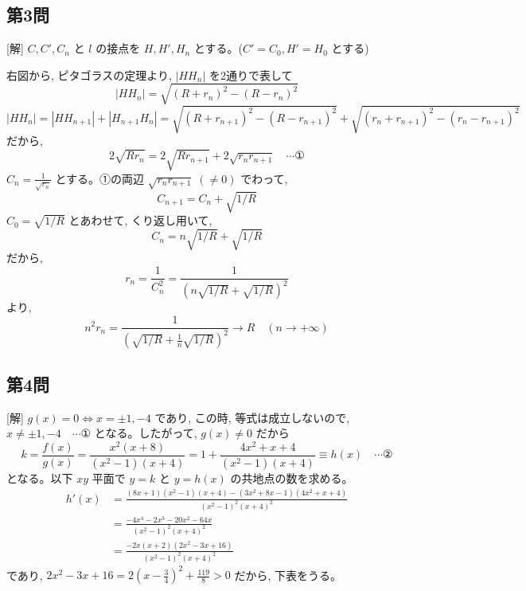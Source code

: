 \documentclass[../main.tex]{subfiles}
\begin{document}
\subsection*{第3問}

[解] $C, C', C_n$ と $l$ の接点を $H, H', H_n$ とする。($C' = C_0, H' = H_0$ とする)

右図から, ピタゴラスの定理より, $|HH_n|$ を2通りで表して
\[
  |HH_n| = \sqrt{(R+r_n)^2 - (R-r_n)^2}
\]
\[
  |HH_n| = |HH_{n+1}| + |H_{n+1}H_n| = \sqrt{(R+r_{n+1})^2 - (R-r_{n+1})^2} + \sqrt{(r_n+r_{n+1})^2 - (r_n-r_{n+1})^2}
\]
だから,
\[
  2\sqrt{Rr_n} = 2\sqrt{Rr_{n+1}} + 2\sqrt{r_n r_{n+1}} \quad \cdots \text{①}
\]
$C_n = \frac{1}{\sqrt{r_n}}$ とする。①の両辺 $\sqrt{r_n r_{n+1}} \; (\neq 0)$ でわって,
\[
  C_{n+1} = C_n + \sqrt{1/R}
\]
$C_0 = \sqrt{1/R}$ とあわせて, くり返し用いて,
\[
  C_n = n\sqrt{1/R} + \sqrt{1/R}
\]
だから,
\[
  r_n = \frac{1}{C_n^2} = \frac{1}{(n\sqrt{1/R} + \sqrt{1/R})^2}
\]
より,
\[
  n^2 r_n = \frac{1}{(\sqrt{1/R} + \frac{1}{n}\sqrt{1/R})^2} \to R \quad (n \to +\infty)
\]

\begin{center}
\end{center}

\subsection*{第4問}

[解] $g(x) = 0 \iff x = \pm 1, -4$ であり, この時, 等式は成立しないので, $x \neq \pm 1, -4 \quad \cdots \text{①}$ となる。したがって, $g(x) \neq 0$ だから
\[
  k = \frac{f(x)}{g(x)} = \frac{x^2(x+8)}{(x^2-1)(x+4)} = 1 + \frac{4x^2+x+4}{(x^2-1)(x+4)} \equiv h(x) \quad \cdots \text{②}
\]
となる。以下 $xy$ 平面で $y=k$ と $y=h(x)$ の共地点の数を求める。
\[
  \begin{aligned}
    h'(x) &= \frac{(8x+1)(x^2-1)(x+4) - (3x^2+8x-1)(4x^2+x+4)}{(x^2-1)^2 (x+4)^2} \\
    &= \frac{-4x^4 - 2x^3 - 20x^2 - 64x}{(x^2-1)^2 (x+4)^2} \\
    &= \frac{-2x(x+2)(2x^2 - 3x + 16)}{(x^2-1)^2 (x+4)^2}
  \end{aligned}
\]
であり, $2x^2 - 3x + 16 = 2\left(x - \frac{3}{4}\right)^2 + \frac{119}{8} > 0$ だから, 下表をうる。
\end{document}
